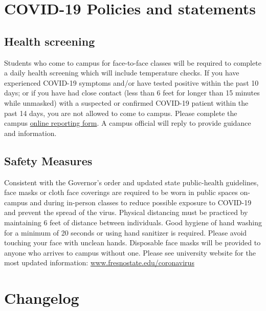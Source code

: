 \hypertarget{covid-19-policies-and-statements}{%
\section{COVID-19 Policies and
statements}\label{covid-19-policies-and-statements}}

\hypertarget{health-screening}{%
\subsection{Health screening}\label{health-screening}}

Students who come to campus for face-to-face classes will be required to
complete a daily health screening which will include temperature checks.
If you have experienced COVID-19 symptoms and/or have tested positive
within the past 10 days; or if you have had close contact (less than 6
feet for longer than 15 minutes while unmasked) with a suspected or
confirmed COVID-19 patient within the past 14 days, you are not allowed
to come to campus. Please complete the campus
\href{https://fresnostate.co1.qualtrics.com/jfe/form/SV_3faIAsuC8CzuFjD?Q_FormSessionID=FS_UFJ902LXgDJbKeZ}{online
reporting form}. A campus official will reply to provide guidance and
information.

\hypertarget{safety-measures}{%
\subsection{Safety Measures}\label{safety-measures}}

Consistent with the Governor's order and updated state public-health
guidelines, face masks or cloth face coverings are required to be worn
in public spaces on-campus and during in-person classes to reduce
possible exposure to COVID-19 and prevent the spread of the virus.
Physical distancing must be practiced by maintaining 6 feet of distance
between individuals. Good hygiene of hand washing for a minimum of 20
seconds or using hand sanitizer is required. Please avoid touching your
face with unclean hands. Disposable face masks will be provided to
anyone who arrives to campus without one. Please see university website
for the most updated information:
\href{http://www.fresnostate.edu/president/coronavirus/index.html}{www.fresnostate.edu/coronavirus}

\hypertarget{changelog}{%
\section{Changelog}\label{changelog}}

